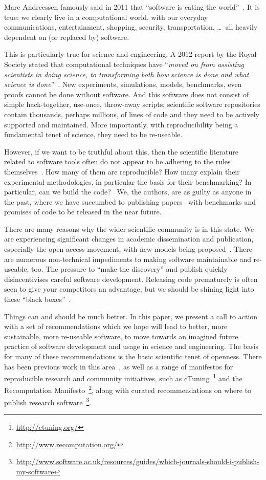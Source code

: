 \documentclass[conference]{IEEEtran}
\begin{document}
Marc Andreessen famously said in 2011 that ``software is eating the
world''~\cite{andreessen:2011}. It is true: we clearly live in a
computational world, with our everyday communications, entertainment,
shopping, security, transportation, \dots\ all heavily dependent on
(or replaced by) software.

This is particularly true for science and engineering. A 2012 report
by the Royal Society stated that computational techniques have
``{\emph{moved on from assisting scientists in doing science, to
transforming both how science is done and what science is
done}}''~\cite{rssaaoe:2012}. New experiments, simulations, models,
benchmarks, even proofs cannot be done without software. And this
software does not consist of simple hack-together, use-once,
throw-away scripts; scientific software repositories contain
thousands, perhaps millions, of lines of code and they need to be
actively supported and maintained. More importantly, with
reproducibility being a fundamental tenet of science, they need to be
re-useable.

However, if we want to be truthful about this, then the scientific
literature related to software tools often do not appear to be
adhering to the rules themselves~\cite{nature:2011}. How many of them are
reproducible? How many explain their experimental methodologies, in
particular the basis for their benchmarking? In particular, can we build the
code?~\cite{collberg-et-al:2014} We, the authors, are as guilty as
anyone in the past, where we have succumbed to publishing
papers~\cite{crick-et-al:2009,Berdine2011SLAyer} with benchmarks and
promises of code to be released in the near future.

There are many reasons why the wider scientific community is in this
state. We are experiencing significant changes in academic
dissemination and publication, especially the open access movement,
with new models being
proposed~\cite{stodden-et-al:2013,fursin+dubach:2014}.  There are
numerous non-technical impediments to making software maintainable and
re-useable, too. The pressure to ``make the discovery'' and publish
quickly disincentivises careful software development. Releasing
code prematurely is often seen to give your competitors an
advantage, but we should be shining light into these ``black
boxes''~\cite{morin-et-al:2012}.

Things can and should be much better. In this paper, we present a call
to action with a set of recommendations which we hope will lead to
better, more sustainable, more re-useable software, to move towards an
imagined future practice of software development and usage in science
and engineering.  The basis for many of these recommendations is the
basic scientific tenet of openness. There has been previous work in
this area~\cite{sim-et-al:2003,chirigati-et-al:2013}, as well as a
range of manifestos for reproducible research and community
initiatives, such as cTuning~\footnote{\url{http://ctuning.org/}} and
the Recomputation
Manifesto~\footnote{\url{http://www.recomputation.org/}},
along with curated recommendations on where to publish research
software~\footnote{\url{http://www.software.ac.uk/resources/guides/which-journals-should-i-publish-my-software}}.
\end{document}
